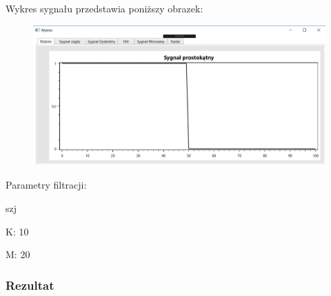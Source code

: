 \documentclass[12pt]{article}
\begin{document}
Wykres sygnału przedstawia poniższy obrazek:
\begin{figure}[h!]
 \centering
 \includegraphics[width=12.3cm]{prost.PNG}
 \vspace{-0.3cm}
 \label{gw}
\end{figure}

Parametry filtracji:

\begin{labeling}{szj}
\item [K:] 10
\item [M:] 20 
\end{labeling}

\subsubsection{Rezultat}
\end{document}
